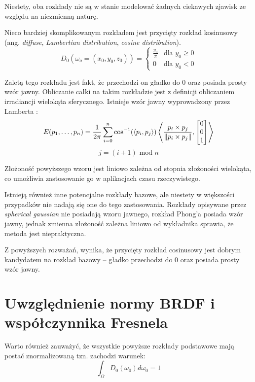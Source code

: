 \documentclass[../main.tex]{subfiles}
\begin{document}
Niestety, oba rozkłady nie są w stanie modelować żadnych ciekawych zjawisk
ze względu na niezmienną naturę.

Nieco bardziej skomplikowanym rozkładem jest przycięty rozkład kosinusowy (ang.
\textit{diffuse}, \textit{Lambertian distribution}, \textit{cosine
distribution}).
\[
D_0(\omega_o=(x_0, y_0, z_0)) = \begin{cases}
  \frac{y_0}{\pi} & \text{dla } y_0 \geq 0 \\
  0 & \text{dla } y_0 < 0
\end{cases}
\]

Zaletą tego rozkładu jest fakt, że przechodzi on gładko do 0 oraz posiada
prosty wzór jawny. Obliczanie całki na takim rozkładzie jest z definicji
obliczaniem irradiancji wielokąta sferycznego. Istnieje wzór jawny
wyprowadzony przez Lamberta \cite{Baum}:
\[
E(p_1, \ldots, p_n) =
\frac{1}{2\pi}
\sum_{i=0}^{n} {
  \cos^{-1}(\langle p_i, p_j \rangle)
  \left\langle {
    \frac{p_i \times p_j}{\norm{p_i \times p_j}},
    \left[ \begin{matrix} 0 \\ 0 \\ 1 \end{matrix} \right]
  } \right\rangle
}
\]
\[
j = (i+1) \text{ mod } n
\]

Złożoność powyższego wzoru jest liniowo zależna od stopnia złożoności
wielokąta, co umożliwia zastosowanie go w aplikacjach czasu rzeczywistego.

Istnieją również inne potencjalne rozkłady bazowe, ale niestety
w większości przypadków nie nadają się one do tego zastosowania. Rozkłady
opisywane przez \textit{spherical gaussian} nie posiadają wzoru jawnego, rozkład
Phong’a posiada wzór jawny, jednak zmienna złożoność zależna liniowo od
wykładnika sprawia, że metoda jest niepraktyczna.


Z powyższych rozważań, wynika, że przycięty rozkład cosinusowy jest dobrym
kandydatem na rozkład bazowy – gładko przechodzi do 0 oraz posiada prosty
wzór jawny.

\section{Uwzględnienie  normy BRDF i współczynnika Fresnela}

Warto również zauważyć, że wszystkie powyższe rozkłady podstawowe mają
postać znormalizowaną tzn. zachodzi warunek:
\[
\int_\Omega {
    D_0(\omega_0)
    d \omega_0
} = 1
\]
\end{document}
